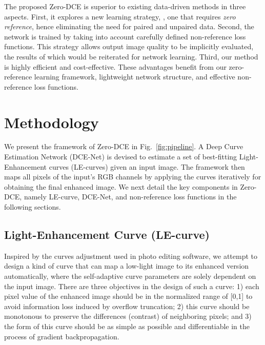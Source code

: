 \documentclass[10pt,twocolumn,letterpaper]{article}
\begin{document}
The proposed Zero-DCE is superior to existing data-driven methods in three aspects. First, it explores a new learning strategy, \ie, one that requires \textit{zero reference}, hence eliminating the need for paired and unpaired data. Second, the network is trained by taking into account carefully defined non-reference loss functions. This strategy allows output image quality to be implicitly evaluated, the results of which would be reiterated for network learning. Third, our method is highly efficient and cost-effective. These advantages benefit from our zero-reference learning framework, lightweight network structure, and effective non-reference loss functions.

\vspace{-5pt}
\section{Methodology}


We present the framework of Zero-DCE in Fig.~\ref{fig:pipeline}.
A Deep Curve Estimation Network (DCE-Net) is devised to estimate a set of best-fitting Light-Enhancement curves (LE-curves) given an input image.
The framework then maps all pixels of the input's RGB channels by applying the curves iteratively for obtaining the final enhanced image.
We next detail the key components in Zero-DCE, namely LE-curve, DCE-Net, and non-reference loss functions in the following sections.

\vspace{-5pt}
\subsection{Light-Enhancement Curve (LE-curve)}

Inspired by the curves adjustment used in photo editing software, we attempt to design a kind of curve that can map a low-light image to its enhanced version automatically, where the self-adaptive curve parameters are solely dependent on the input image.
There are three objectives in the design of such a curve: 1) each pixel value of the enhanced image should be in the normalized range of [0,1] to avoid information loss induced by overflow truncation; 2) this curve should be monotonous to preserve the differences (contrast) of neighboring pixels; and 3) the form of this curve should be as simple as possible and differentiable in the process of gradient backpropagation.
\end{document}
